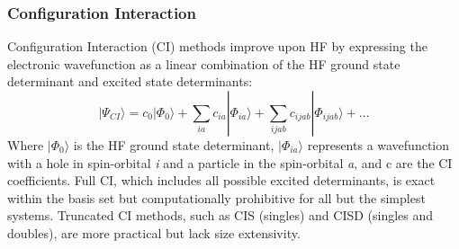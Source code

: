 \subsubsection{Configuration Interaction}
Configuration Interaction (CI) methods improve upon HF by expressing the electronic wavefunction as a linear combination of the HF ground state determinant and excited state determinants:
\begin{equation} \label{eq:CI}
     |\Psi_{CI} \rangle = c_0 |\Phi_0 \rangle + \sum_{ia} c_{ia} |\Phi_{ia} \rangle + \sum_{ijab} c_{ijab} |\Phi_{ijab} \rangle + \dots
\end{equation}
Where $|\Phi_0 \rangle$ is the HF ground state determinant, $|\Phi_{ia} \rangle$ represents a wavefunction with a hole in spin-orbital \textit{i} and a particle in the spin-orbital \textit{a}, and c are the CI coefficients. Full CI, which includes all possible excited determinants, is exact within the basis set but computationally prohibitive for all but the simplest systems. Truncated CI methods, such as CIS (singles) and CISD (singles and doubles), are more practical but lack size extensivity.

